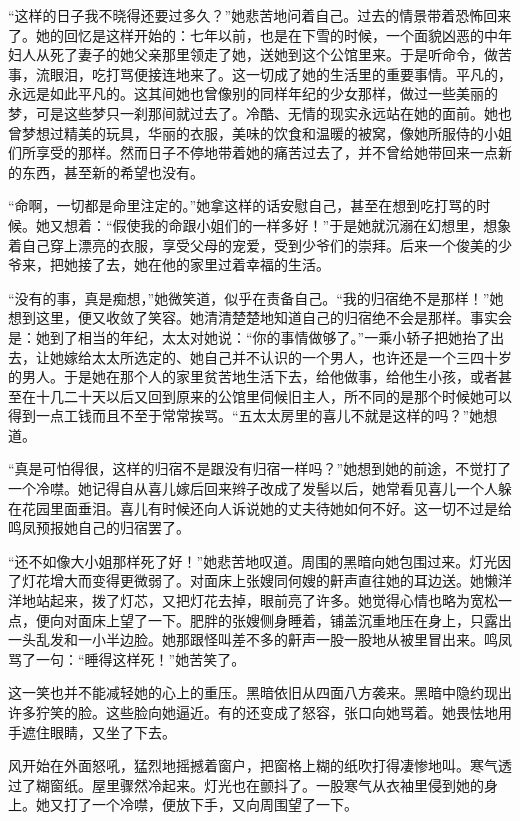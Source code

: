 \par “这样的日子我不晓得还要过多久？”她悲苦地问着自己。过去的情景带着恐怖回来了。她的回忆是这样开始的：七年以前，也是在下雪的时候，一个面貌凶恶的中年妇人从死了妻子的她父亲那里领走了她，送她到这个公馆里来。于是听命令，做苦事，流眼泪，吃打骂便接连地来了。这一切成了她的生活里的重要事情。平凡的，永远是如此平凡的。这其间她也曾像别的同样年纪的少女那样，做过一些美丽的梦，可是这些梦只一刹那间就过去了。冷酷、无情的现实永远站在她的面前。她也曾梦想过精美的玩具，华丽的衣服，美味的饮食和温暖的被窝，像她所服侍的小姐们所享受的那样。然而日子不停地带着她的痛苦过去了，并不曾给她带回来一点新的东西，甚至新的希望也没有。
\par “命啊，一切都是命里注定的。”她拿这样的话安慰自己，甚至在想到吃打骂的时候。她又想着：“假使我的命跟小姐们的一样多好！”于是她就沉溺在幻想里，想象着自己穿上漂亮的衣服，享受父母的宠爱，受到少爷们的崇拜。后来一个俊美的少爷来，把她接了去，她在他的家里过着幸福的生活。
\par “没有的事，真是痴想，”她微笑道，似乎在责备自己。“我的归宿绝不是那样！”她想到这里，便又收敛了笑容。她清清楚楚地知道自己的归宿绝不会是那样。事实会是：她到了相当的年纪，太太对她说：“你的事情做够了。”一乘小轿子把她抬了出去，让她嫁给太太所选定的、她自己并不认识的一个男人，也许还是一个三四十岁的男人。于是她在那个人的家里贫苦地生活下去，给他做事，给他生小孩，或者甚至在十几二十天以后又回到原来的公馆里伺候旧主人，所不同的是那个时候她可以得到一点工钱而且不至于常常挨骂。“五太太房里的喜儿不就是这样的吗？”她想道。
\par “真是可怕得很，这样的归宿不是跟没有归宿一样吗？”她想到她的前途，不觉打了一个冷噤。她记得自从喜儿嫁后回来辫子改成了发髻以后，她常看见喜儿一个人躲在花园里面垂泪。喜儿有时候还向人诉说她的丈夫待她如何不好。这一切不过是给鸣凤预报她自己的归宿罢了。
\par “还不如像大小姐那样死了好！”她悲苦地叹道。周围的黑暗向她包围过来。灯光因了灯花增大而变得更微弱了。对面床上张嫂同何嫂的鼾声直往她的耳边送。她懒洋洋地站起来，拨了灯芯，又把灯花去掉，眼前亮了许多。她觉得心情也略为宽松一点，便向对面床上望了一下。肥胖的张嫂侧身睡着，铺盖沉重地压在身上，只露出一头乱发和一小半边脸。她那跟怪叫差不多的鼾声一股一股地从被里冒出来。鸣凤骂了一句：“睡得这样死！”她苦笑了。
\par 这一笑也并不能减轻她的心上的重压。黑暗依旧从四面八方袭来。黑暗中隐约现出许多狞笑的脸。这些脸向她逼近。有的还变成了怒容，张口向她骂着。她畏怯地用手遮住眼睛，又坐了下去。
\par 风开始在外面怒吼，猛烈地摇撼着窗户，把窗格上糊的纸吹打得凄惨地叫。寒气透过了糊窗纸。屋里骤然冷起来。灯光也在颤抖了。一股寒气从衣袖里侵到她的身上。她又打了一个冷噤，便放下手，又向周围望了一下。
